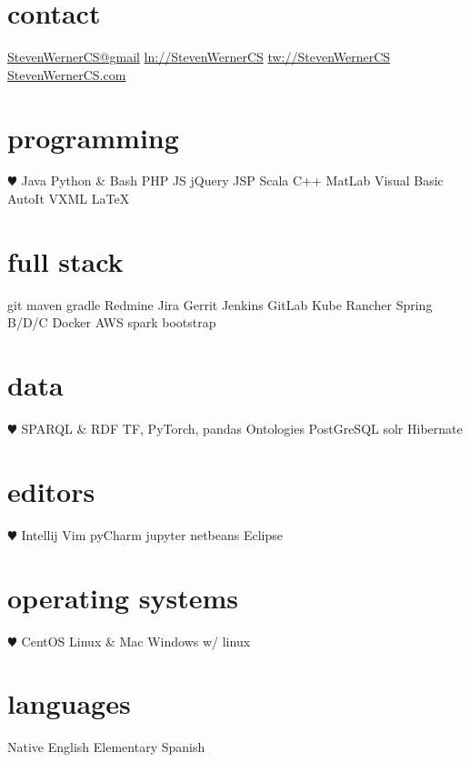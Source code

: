 \documentclass[]{friggeri-cv} %
\begin{document}


\begin{aside1} 
\section{contact}
\href{mailto:StevenWernerCS@gmail.com}{StevenWernerCS@gmail}
\href{http://linkedin.com/in/StevenWernerCS}{ln://StevenWernerCS}
\href{http://www.twitter.com/StevenWernerCS}{tw://StevenWernerCS}
\href{http://www.StevenWernerCS.com}{StevenWernerCS.com}
\section{programming}
{\color{red} $\varheartsuit$} Java Python \& Bash
PHP JS jQuery JSP
Scala C++ MatLab 
Visual Basic AutoIt 
VXML {\selectfont \LaTeX}
\section{full stack}
git maven gradle
Redmine Jira Gerrit
Jenkins GitLab
Kube Rancher
Spring B/D/C
Docker AWS
spark bootstrap
\section{data}
{\color{red} $\varheartsuit$} SPARQL \& RDF
TF, PyTorch, pandas
Ontologies
PostGreSQL
solr Hibernate
\section{editors}
{\color{red} $\varheartsuit$} Intellij Vim
pyCharm jupyter
netbeans Eclipse
\section{operating systems}
{\color{red} $\varheartsuit$} CentOS Linux \& Mac 
Windows w/ linux
\section{languages}
Native English
Elementary Spanish
\end{aside1}
\end{document}
